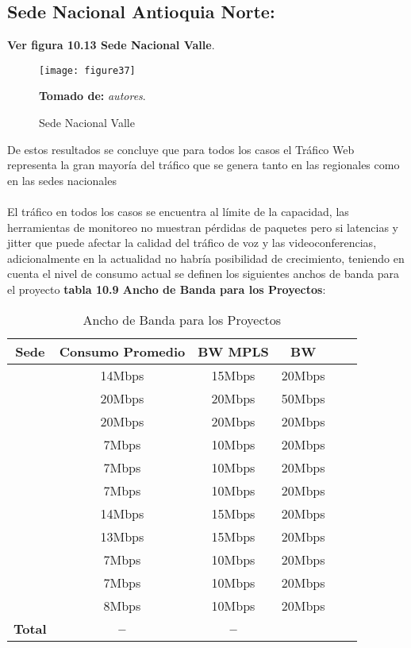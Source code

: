 \subsection{Sede Nacional Antioquia Norte:} %
\label{sec:Sede Nacional Antioquia Norte:}

\textbf{Ver figura 10.13 Sede Nacional Valle}.
\begin{figure}[htbp]
  \centering
    {\texttt{[image: figure37]}}%
  \caption{\footnotesize{Sede Nacional Valle}}
   \footnotesize{\textbf{Tomado de:} \textit{autores}.}
  \label{fig:fig2subfig}
\end{figure}

De estos resultados se concluye que para todos los casos el Tráfico Web representa la gran mayoría del tráfico que se genera tanto en las regionales como en las sedes nacionales
\\
\\
El tráfico en todos los casos se encuentra al límite de la capacidad, las herramientas de monitoreo no muestran pérdidas de paquetes pero si latencias y jitter que puede afectar la calidad del tráfico de voz y las videoconferencias, adicionalmente en la actualidad no habría posibilidad de crecimiento, teniendo en cuenta el nivel de consumo actual se definen los siguientes anchos de banda para el proyecto \textbf{tabla 10.9 Ancho de Banda para los Proyectos}:

\begin{table}[ht]
	\caption{Ancho de Banda para los Proyectos}
	\label{tab:hla:results}
\centering
\begin{tabular}{lccccc}
	\toprule
	\multicolumn{1}{c}{\textbf{Sede}} 	& \textbf{Consumo Promedio}	& \textbf{BW MPLS} & \textbf{BW}\\
	\midrule
\cite{Nacional Medellin} 		& 14Mbps & 15Mbps  & 20Mbps \\
\cite{Antioquia Norte} 		& 20Mbps & 20Mbps & 50Mbps\\
\cite{Nacional Tocancipa} 		& 20Mbps & 20Mbps & 20Mbps \\
\cite{Soacha} 		& 7Mbps & 10Mbps & 20Mbps \\
\cite{Antioquia Sur} 		& 7Mbps & 10Mbps & 20Mbps \\
\cite{Antioquia Oriente} 		& 7Mbps & 10Mbps & 20Mbps \\
\cite{Eje Cafetero} 		& 14Mbps & 15Mbps & 20Mbps \\
\cite{Valle} 		& 13Mbps & 15Mbps & 20Mbps \\
\cite{Cota} 		& 7Mbps & 10Mbps & 20Mbps \\
\cite{Bucaramanga} 		& 7Mbps & 10Mbps & 20Mbps \\
\cite{Funza} 		& 8Mbps & 10Mbps & 20Mbps \\
	\midrule
	\textbf{Total}			& \textbf{--}		& \textbf{--} \\
	\bottomrule
\end{tabular}
\end{table}

